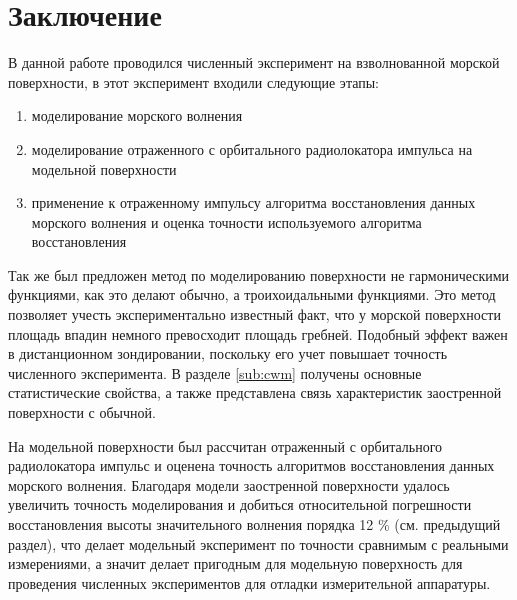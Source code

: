 \section{Заключение}%
\label{sec:zakliuchenie}

В данной работе проводился численный эксперимент на взволнованной морской
поверхности, в этот эксперимент входили следующие этапы:
\begin{enumerate}
    \item моделирование морского волнения
    \item моделирование отраженного с орбитального радиолокатора импульса на модельной поверхности
    \item применение к отраженному импульсу алгоритма восстановления данных
    морского волнения и оценка точности используемого алгоритма
    восстановления
\end{enumerate}

Так же был предложен метод по моделированию поверхности не гармоническими
функциями, как это делают обычно, а троихоидальными функциями. Это метод
позволяет учесть экспериментально известный факт, что у морской поверхности
площадь впадин немного превосходит площадь гребней. Подобный эффект важен в
дистанционном зондировании, поскольку его учет повышает точность численного
эксперимента.  В разделе \ref{sub:cwm} получены основные статистические
свойства, а также представлена связь характеристик заостренной поверхности с
обычной.


На модельной поверхности был рассчитан отраженный с орбитального радиолокатора
импульс и оценена точность алгоритмов восстановления данных морского волнения. 
Благодаря модели заостренной поверхности удалось увеличить точность
моделирования и добиться относительной погрешности восстановления высоты
значительного волнения порядка 12 \% (см. предыдущий раздел), что делает
модельный эксперимент по точности сравнимым с реальными измерениями, а значит
делает пригодным для модельную поверхность для проведения численных
экспериментов для отладки измерительной аппаратуры.
